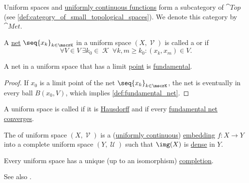 \begin{definition}\label{def:category_of_uniform_spaces}
  Uniform spaces and \hyperref[def:uniform_continuity]{uniformly continuous functions} form a subcategory of \( \cat{Top} \) (see \cref{def:category_of_small_topological_spaces}). We denote this category by \( \cat{Met} \).
\end{definition}

\begin{definition}\label{def:fundamental_net}
  A \hyperref[def:topological_net]{net} \( \seq{ x_k }_{k \in \mscrK} \) in a uniform space \( (X, \mscrV) \) is called a  or  if
  \begin{equation*}
    \forall V \in V \ \exists k_0 \in \mscrK \ \forall k, m \geq k_0 : (x_k, x_m) \in V.
  \end{equation*}
\end{definition}

\begin{lemma}\label{thm:convergent_net_is_fundamental}
  A net in a uniform space that has a limit \hyperref[def:net_limit_point]{point} is \hyperref[def:fundamental_net]{fundamental}.
\end{lemma}
\begin{proof}
  If \( x_0 \) is a limit point of the net \( \seq{ x_k }_{k \in \mscrK} \), the net is eventually in every ball \( B(x_0, V) \), which implies \cref{def:fundamental_net}.
\end{proof}

\begin{definition}\label{def:complete_uniform_space}
  A uniform space is called  if it is \hyperref[def:separation_axioms/T2]{Hausdorff} and if every \hyperref[def:fundamental_net]{fundamental net} \hyperref[def:net_limit_point]{converges}.

  The  of uniform space \( (X, \mscrV) \) is a (\hyperref[def:uniform_continuity]{uniformly continuous}) \hyperref[def:morphism_cancellation/left]{embedding} \( f: X \to Y \) into a complete uniform space \( (Y, \mscrU) \) such that \( \img(X) \) is \hyperref[def:topologically_dense_set]{dense} in \( Y \).
\end{definition}

\begin{theorem}\label{thm:uniform_space_completion}
  Every uniform space has a unique (up to an isomorphism) \hyperref[def:complete_uniform_space]{completion}.

  See also .
\end{theorem}

